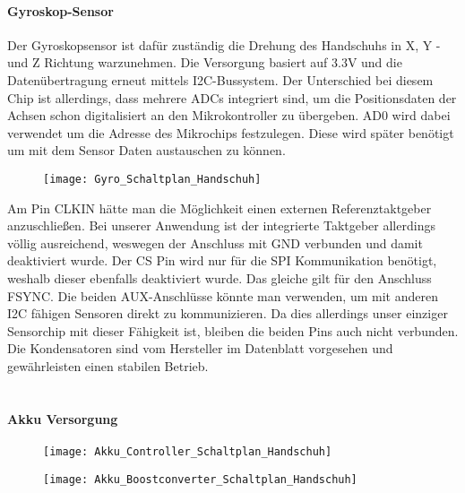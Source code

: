 \documentclass[titlepage,12pt,twoside]{article}
\begin{document}
\paragraph{Gyroskop-Sensor}
\hfill \break
\hfill \break
Der Gyroskopsensor ist dafür zuständig die Drehung des Handschuhs in X, Y -und Z Richtung warzunehmen. Die Versorgung basiert 
auf 3.3V und die Datenübertragung erneut mittels I2C-Bussystem. Der Unterschied bei diesem Chip ist allerdings, dass mehrere ADCs
integriert sind, um die Positionsdaten der Achsen schon digitalisiert an den Mikrokontroller zu übergeben. AD0 wird dabei verwendet
um die Adresse des Mikrochips festzulegen. Diese wird später benötigt um mit dem Sensor Daten austauschen zu können.
\\
\begin{figure}[H]
	\begin{center}
		\scalebox{0.5}
		{\texttt{[image: Gyro\_Schaltplan\_Handschuh]}}
	\end{center}
\end{figure}
Am Pin CLKIN hätte man die Möglichkeit einen externen Referenztaktgeber anzuschließen. Bei unserer Anwendung ist der integrierte 
Taktgeber allerdings völlig ausreichend, weswegen der Anschluss mit GND verbunden und damit deaktiviert wurde. Der CS Pin wird nur
für die SPI Kommunikation benötigt, weshalb dieser ebenfalls deaktiviert wurde. Das gleiche gilt für den Anschluss FSYNC. Die beiden
AUX-Anschlüsse könnte man verwenden, um mit anderen I2C fähigen Sensoren direkt zu kommunizieren. Da dies allerdings unser einziger
Sensorchip mit dieser Fähigkeit ist, bleiben die beiden Pins auch nicht verbunden. Die Kondensatoren sind vom Hersteller im Datenblatt
vorgesehen und gewährleisten einen stabilen Betrieb. \\
\\
\paragraph{Akku Versorgung}
\hfill \break
\hfill \break
\begin{figure}[H]
	\begin{center}
		\scalebox{0.5}
		{\texttt{[image: Akku\_Controller\_Schaltplan\_Handschuh]}}
	\end{center}
\end{figure}

\begin{figure}[H]
	\begin{center}
		\scalebox{0.5}
		{\texttt{[image: Akku\_Boostconverter\_Schaltplan\_Handschuh]}}
	\end{center}
\end{figure}
\end{document}
